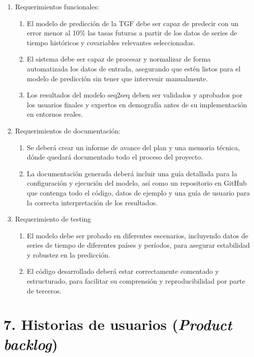 \documentclass[
11pt, %
]{charter}
\begin{document}
\begin{enumerate}
	\item Requerimientos funcionales:
		\begin{enumerate}
				\item El modelo de predicción de la TGF debe ser capaz de predecir con un error menor al 10\% las tasas futuras a partir de los datos de series de tiempo históricos y covariables relevantes seleccionadas.
				\item El sistema debe ser capaz de procesar y normalizar de forma automatizada los datos de entrada, asegurando que estén listos para el modelo de predicción sin tener que  intervenir manualmente.
				\item Los resultados del modelo seq2seq deben ser validados y aprobados por los usuarios finales y  expertos en demografía antes de su implementación en entornos reales.
			\end{enumerate}
	\item Requerimientos de documentación:
		\begin{enumerate}
				\item Se deberá crear un informe de avance del plan y una memoria técnica, dónde quedará documentado todo el proceso del proyecto.
				\item La documentación generada deberá incluir una guía detallada para la configuración y ejecución del modelo, así como un repositorio en GitHub que contenga todo el código, datos de ejemplo y una guía de usuario para la correcta interpretación de los resultados.

			\end{enumerate}
	\item Requerimiento de testing
		\begin{enumerate}
			\item El modelo debe ser probado en diferentes escenarios, incluyendo datos de series de tiempo de diferentes países y períodos, para asegurar estabilidad y robustez en la predicción.
			\item El código desarrollado deberá estar correctamente comentado y estructurado, para facilitar su comprensión y reproducibilidad por parte de terceros.

		\end{enumerate}

\end{enumerate}

\section{7. Historias de usuarios (\textit{Product backlog})}
\label{sec:backlog}
\end{document}
